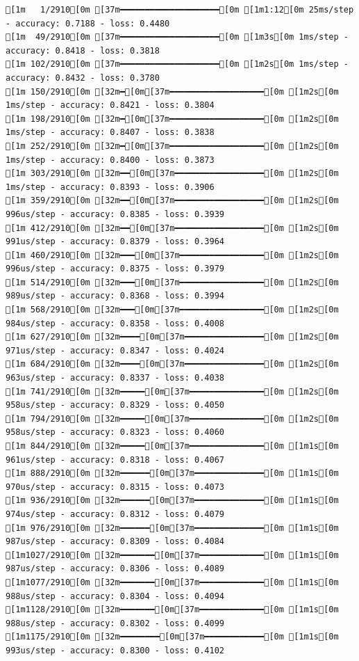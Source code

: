 \documentclass[
  letterpaper,
  DIV=11,
  numbers=noendperiod]{scrartcl}
\begin{document}
\begin{verbatim}
[1m   1/2910[0m [37m━━━━━━━━━━━━━━━━━━━━[0m [1m1:12[0m 25ms/step - accuracy: 0.7188 - loss: 0.4480
[1m  49/2910[0m [37m━━━━━━━━━━━━━━━━━━━━[0m [1m3s[0m 1ms/step - accuracy: 0.8418 - loss: 0.3818   
[1m 102/2910[0m [37m━━━━━━━━━━━━━━━━━━━━[0m [1m2s[0m 1ms/step - accuracy: 0.8432 - loss: 0.3780
[1m 150/2910[0m [32m━[0m[37m━━━━━━━━━━━━━━━━━━━[0m [1m2s[0m 1ms/step - accuracy: 0.8421 - loss: 0.3804
[1m 198/2910[0m [32m━[0m[37m━━━━━━━━━━━━━━━━━━━[0m [1m2s[0m 1ms/step - accuracy: 0.8407 - loss: 0.3838
[1m 252/2910[0m [32m━[0m[37m━━━━━━━━━━━━━━━━━━━[0m [1m2s[0m 1ms/step - accuracy: 0.8400 - loss: 0.3873
[1m 303/2910[0m [32m━━[0m[37m━━━━━━━━━━━━━━━━━━[0m [1m2s[0m 1ms/step - accuracy: 0.8393 - loss: 0.3906
[1m 359/2910[0m [32m━━[0m[37m━━━━━━━━━━━━━━━━━━[0m [1m2s[0m 996us/step - accuracy: 0.8385 - loss: 0.3939
[1m 412/2910[0m [32m━━[0m[37m━━━━━━━━━━━━━━━━━━[0m [1m2s[0m 991us/step - accuracy: 0.8379 - loss: 0.3964
[1m 460/2910[0m [32m━━━[0m[37m━━━━━━━━━━━━━━━━━[0m [1m2s[0m 996us/step - accuracy: 0.8375 - loss: 0.3979
[1m 514/2910[0m [32m━━━[0m[37m━━━━━━━━━━━━━━━━━[0m [1m2s[0m 989us/step - accuracy: 0.8368 - loss: 0.3994
[1m 568/2910[0m [32m━━━[0m[37m━━━━━━━━━━━━━━━━━[0m [1m2s[0m 984us/step - accuracy: 0.8358 - loss: 0.4008
[1m 627/2910[0m [32m━━━━[0m[37m━━━━━━━━━━━━━━━━[0m [1m2s[0m 971us/step - accuracy: 0.8347 - loss: 0.4024
[1m 684/2910[0m [32m━━━━[0m[37m━━━━━━━━━━━━━━━━[0m [1m2s[0m 963us/step - accuracy: 0.8337 - loss: 0.4038
[1m 741/2910[0m [32m━━━━━[0m[37m━━━━━━━━━━━━━━━[0m [1m2s[0m 958us/step - accuracy: 0.8329 - loss: 0.4050
[1m 794/2910[0m [32m━━━━━[0m[37m━━━━━━━━━━━━━━━[0m [1m2s[0m 958us/step - accuracy: 0.8323 - loss: 0.4060
[1m 844/2910[0m [32m━━━━━[0m[37m━━━━━━━━━━━━━━━[0m [1m1s[0m 961us/step - accuracy: 0.8318 - loss: 0.4067
[1m 888/2910[0m [32m━━━━━━[0m[37m━━━━━━━━━━━━━━[0m [1m1s[0m 970us/step - accuracy: 0.8315 - loss: 0.4073
[1m 936/2910[0m [32m━━━━━━[0m[37m━━━━━━━━━━━━━━[0m [1m1s[0m 974us/step - accuracy: 0.8312 - loss: 0.4079
[1m 976/2910[0m [32m━━━━━━[0m[37m━━━━━━━━━━━━━━[0m [1m1s[0m 987us/step - accuracy: 0.8309 - loss: 0.4084
[1m1027/2910[0m [32m━━━━━━━[0m[37m━━━━━━━━━━━━━[0m [1m1s[0m 987us/step - accuracy: 0.8306 - loss: 0.4089
[1m1077/2910[0m [32m━━━━━━━[0m[37m━━━━━━━━━━━━━[0m [1m1s[0m 988us/step - accuracy: 0.8304 - loss: 0.4094
[1m1128/2910[0m [32m━━━━━━━[0m[37m━━━━━━━━━━━━━[0m [1m1s[0m 988us/step - accuracy: 0.8302 - loss: 0.4099
[1m1175/2910[0m [32m━━━━━━━━[0m[37m━━━━━━━━━━━━[0m [1m1s[0m 993us/step - accuracy: 0.8300 - loss: 0.4102

\end{verbatim}
\end{document}
